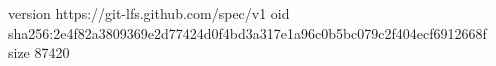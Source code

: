 version https://git-lfs.github.com/spec/v1
oid sha256:2e4f82a3809369e2d77424d0f4bd3a317e1a96c0b5bc079c2f404ecf6912668f
size 87420
